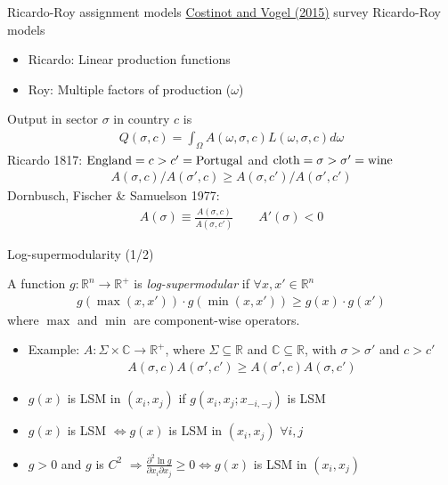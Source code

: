 \documentclass[10pt,notes=hide]{beamer}
\begin{document}
\begin{frame}{Ricardo-Roy assignment models}
\href{https://www.annualreviews.org/doi/full/10.1146/annurev-economics-080213-041435}{Costinot and Vogel (2015)} survey Ricardo-Roy models
\begin{itemize}
	\item Ricardo: Linear production functions
	\item Roy: Multiple factors of production ($\omega$)
\end{itemize}
Output in sector $\sigma$ in country $c$ is
\begin{align*}
Q(\sigma,c)=\int_{\Omega} A(\omega,\sigma,c)L(\omega,\sigma,c)d\omega
\end{align*}
Ricardo 1817: $\textnormal{England}=c>c'=\textnormal{Portugal}$ and $\textnormal{cloth}=\sigma>\sigma'=\textnormal{wine}$
\begin{align*}
A(\sigma,c) / A(\sigma',c) \geq A(\sigma,c') / A(\sigma',c')
\end{align*}
Dornbusch, Fischer \& Samuelson 1977: 
\begin{align*}
A(\sigma) \equiv \frac{A(\sigma,c)}{A(\sigma,c')} \qquad A'(\sigma)<0
\end{align*}
\end{frame}
\begin{frame}{Log-supermodularity (1/2)}
\begin{definition}
A function $g:\mathbb{R}^n\to\mathbb{R}^{+}$ is \emph{log-supermodular} if $\forall x,x'\in\mathbb{R}^n$
\begin{align*}
g\left(\max\left(x,x'\right)\right)\cdot g\left(\min\left(x,x'\right)\right)\geq g(x)\cdot g(x')
\end{align*}
where $\max$ and $\min$ are component-wise operators.
\end{definition}
\begin{itemize}
	\item Example: $A: \Sigma\times\mathbb{C}\to\mathbb{R}^{+}$, where $\Sigma\subseteq\mathbb{R}$ and $\mathbb{C}\subseteq\mathbb{R}$, with $\sigma>\sigma'$ and $c>c'$
		\begin{align*}
		A(\sigma,c)A(\sigma',c')\geq A(\sigma',c)A(\sigma,c')
		\end{align*}
	\item $g(x)$ is LSM in $(x_i,x_j)$ if $g(x_i,x_j;x_{-i,-j})$ is LSM 
	\item $g(x)$ is LSM $\iff g(x)$ is LSM in $(x_i,x_j)$  $\forall i,j$
	\item $g>0$ and $g$ is $C^2$ $\Rightarrow \frac{\partial^2 \ln g}{\partial x_i \partial x_j}\geq 0 \iff g(x)$ is LSM in $(x_i,x_j)$
\end{itemize}
\end{frame}
\end{document}
